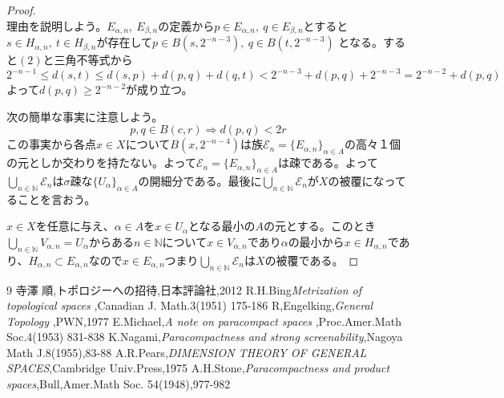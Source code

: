 \documentclass[leqno]{jsarticle}
\newcommand{\To}{\Longrightarrow}
\newcommand{\nn}{\mathbb{N}}
\newcommand{\dpst}{\displaystyle}
\newcommand{\al}{\alpha}
\newcommand{\be}{\beta}
\begin{document}
\begin{proof}
\begin{equation}
\end{equation}
理由を説明しよう。$E_{\al,n},\ E_{\be,n}$の定義から$p\in E_{\al,n},\ q\in E_{\be,n}$とすると
$s\in H_{\al,n},\ t\in H_{\be,n}$が存在して$p\in B(s,2^{-n-3}),\ q\in B(t,2^{-n-3})$
となる。すると$(2)$と三角不等式から
\[
2^{-n-1}\le d(s,t)\le d(s,p)+d(p,q)+d(q,t)<2^{-n-3}+d(p,q)+2^{-n-3}=2^{-n-2}+d(p,q)
\]
よって$d(p,q)\ge 2^{-n-2} $が成り立つ。\par
次の簡単な事実に注意しよう。
\[
p,q\in B(c,r)\To d(p,q)<2r
\]
この事実から各点$x\in X$について$B(x,2^{-n-4})$は族$\mathcal{E}_n=\{E_{\al,n}\}_{\al\in A}$の高々１個の元としか交わりを持たない。よって$\mathcal{E}_n=\{E_{\al,n}\}_{\al\in A}$は疎である。よって$\dpst \bigcup_{n\in \nn}\mathcal{E}_n$は$\sigma$疎な$\{U_{\al}\}_{\al\in A}$の開細分である。最後に$\dpst \bigcup_{n\in \nn}\mathcal{E}_n$が$X$の被覆になってることを言おう。\par 
$x\in X$を任意に与え、$\al\in A$を$x\in U_{\al}$となる最小の$A$の元とする。このとき
$\dpst \bigcup_{n\in \nn}V_{\al,n}=U_{\al}$からある$n\in\nn$について$x\in V_{\al,n}$であり$\al$の最小から$x\in H_{\al,n}$であり、$H_{\al,n}\subset E_{\al,n}$なので$x\in E_{\al,n}$つまり$\dpst \bigcup_{n\in \nn}\mathcal{E}_n$は$X$の被覆である。
\end{proof}



	
\begin{thebibliography}{9}
寺澤 順,トポロジーへの招待,日本評論社,2012
R.H.Bing{\it Metrization of topological spaces },Canadian J. Math.3(1951) 175-186
R,Engelking,{\it General Topology },PWN,1977
E.Michael,{\it A note on paracompact spaces },Proc.Amer.Math Soc.4(1953) 831-838
K.Nagami,{\it Paracompactness and strong screenability},Nagoya Math J.8(1955),83-88
A.R.Pears,{\it DIMENSION THEORY OF GENERAL SPACES},Cambridge Univ.Press,1975
A.H.Stone,{\it Paracompactness and product spaces},Bull,Amer.Math Soc. 54(1948),977-982
\end{thebibliography}




			
\end{document}
